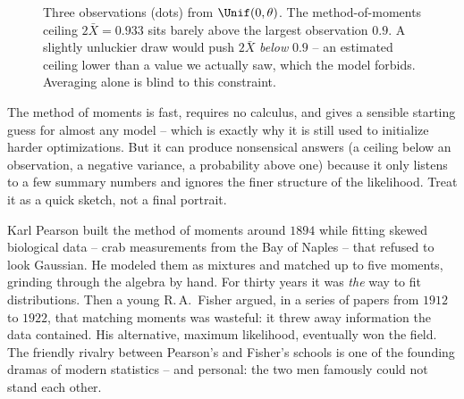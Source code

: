 \begin{figure}[H]
\centering
{}
\caption{Three observations (dots) from $\Unif(0,\theta)$. The method-of-moments
ceiling $2\bar X = 0.933$ sits barely above the largest observation $0.9$. A
slightly unluckier draw would push $2\bar X$ \emph{below} $0.9$ -- an estimated
ceiling lower than a value we actually saw, which the model forbids. Averaging
alone is blind to this constraint.}
\label{ch30:fig-mom-unif}
\end{figure}

\begin{trapbox}
The method of moments is fast, requires no calculus, and gives a sensible
starting guess for almost any model -- which is exactly why it is still used to
initialize harder optimizations. But it can produce nonsensical answers (a
ceiling below an observation, a negative variance, a probability above one)
because it only listens to a few summary numbers and ignores the finer
structure of the likelihood. Treat it as a quick sketch, not a final portrait.
\end{trapbox}

\begin{historybox}
Karl Pearson built the method of moments around $1894$ while fitting skewed
biological data -- crab measurements from the Bay of Naples -- that refused to
look Gaussian. He modeled them as mixtures and matched up to five moments,
grinding through the algebra by hand. For thirty years it was \emph{the} way to
fit distributions. Then a young R.\,A.\ Fisher argued, in a series of papers
from $1912$ to $1922$, that matching moments was wasteful: it threw away
information the data contained. His alternative, maximum likelihood, eventually
won the field. The friendly rivalry between Pearson's and Fisher's schools is
one of the founding dramas of modern statistics -- and personal: the two men
famously could not stand each other.
\end{historybox}

